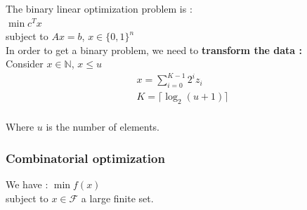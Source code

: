 \documentclass[../main.tex]{subfiles}
\begin{document}
The binary linear optimization problem is : \\
$\min c^Tx$\\
subject to $Ax=b$, $x\in \{0,1\}^n$\\

In order to get a binary problem, we need to \textbf{transform the data : }\\

Consider $x\in \mathbb{N}$, $x\leq u$ \begin{equation}
    \begin{gathered}
        x = \sum_{i=0}^{K-1}2^iz_i\\
        K = \lceil \log_2(u+1)\rceil\\
    \end{gathered}
\end{equation}

Where $u$ is the number of elements.\\

\subsubsection{Combinatorial optimization}
We have : $\min f(x)$\\
subject to $x\in \mathcal{F}$ a large finite set.\\
\end{document}
